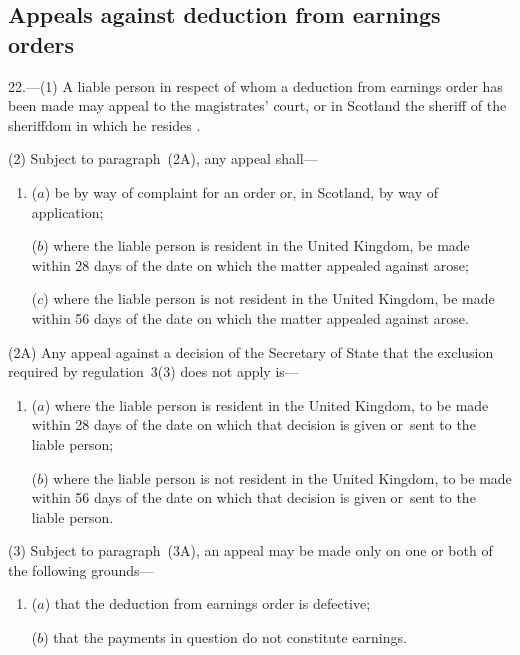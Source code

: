 \documentclass[12pt,a4paper]{article}
\begin{document}
\subsection[22. Appeals against deduction from earnings orders]{Appeals against deduction from earnings orders}

22.—(1) A liable person in respect of whom a deduction from earnings order has been made may appeal to the magistrates' court, or in Scotland the sheriff
of the sheriffdom in which he resides%
.

(2) 
Subject to paragraph~(2A),  %
any appeal shall—
\begin{enumerate}\item[]
($a$) be by way of complaint for an order or, in Scotland, by way of application;

($b$) 
where the liable person is resident in the United Kingdom,  %
be made within 28 days of the date on which the matter appealed against arose;

($c$) where the liable person is not resident in the United Kingdom, be made within 56 days of the date on which the matter appealed against arose.
\end{enumerate}

(2A) Any appeal against a decision of the Secretary of State that the exclusion required by regulation~3(3) does not apply is—
\begin{enumerate}\item[]
($a$) where the liable person is resident in the United Kingdom, to be made within 28 days of the date on which that decision is given or~sent to the liable person;

($b$) where the liable person is not resident in the United Kingdom, to be made within 56 days of the date on which that decision is given or~sent to the liable person.
\end{enumerate}

(3) 
Subject to paragraph~(3A),  %
an appeal may be made only on one or both of the following grounds—
\begin{enumerate}\item[]
($a$) that the deduction from earnings order is defective;

($b$) that the payments in question do not constitute earnings.
\end{enumerate}
\end{document}
